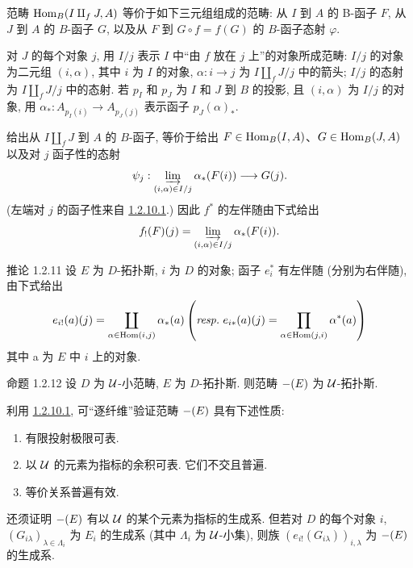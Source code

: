 \sisi{$+$}{} 范畴 $\operatorname{Hom}_B(I \amalg_f J, A)$ 等价于如下三元组组成的范畴:
从 $I$ 到 $A$ 的 B-函子 $F$, 从 $J$ 到 $A$ 的 $B$-函子 $G$,
以及从 $F$ 到 $G \circ f = f(G)$ 的 $B$-函子态射 $\varphi$.

\sisi{$+$}{} 对 $J$ 的每个对象 $j$, 用 $I /j$ 表示 $I$ 中“由 $f$ 放在 $j$ 上”的对象所成范畴:
$I /j$ 的对象为二元组 $(i, \alpha)$, 其中 $i$ 为 $I$ 的对象,
$\alpha : i \to j$ 为 $I \amalg_f J/j$ 中的箭头;
$I/j$ 的态射为 $I\amalg_{f}J/j$ 中的态射.
若 $p_I$ 和 $p_J$ 为 $I$ 和 $J$ 到 $B$ 的投影, 且 $(i, \alpha)$ 为 $I/j$ 的对象,
用 $\alpha_{\ast} : A_{p_{I}(i)} \to A_{p_{J}(j)}$ 表示函子 $p_{J}(\alpha)_{\ast}$.

\sisi{$+$}{} 给出从 $I \amalg_f J$ 到 $A$ 的 $B$-函子,
等价于给出 $F \in \operatorname{Hom}_B (I, A)$、$G \in \operatorname{Hom}_B (J, A)$
以及对 $j$ 函子性的态射
$$
\psi_j : \varinjlim_{(i, \alpha)\in I/j} \alpha_{\ast}(F(i))
\longrightarrow G(j){}.
$$
(左端对 $j$ 的函子性来自 \hyperref[Vbis.lem1.2.10.1]{1.2.10.1}.)
因此 $f^{\ast}$ 的左伴随由下式给出
$$
f_{!}(F) (j) = \varinjlim_{(i, \alpha)\in I/j}
\alpha_{\ast}(F(i)){}.
$$

\begin{enonce*}{推论 1.2.11}
设\pageoriginale{} $E$ 为 $D$-拓扑斯, $i$ 为 $D$ 的对象;
函子 $e^{\ast}_i$ 有左伴随 (分别为右伴随), 由下式给出
$$
e_{i!}(a)(j) = \coprod_{\alpha \in \operatorname{Hom}(i, j)} \alpha_{\ast}(a)
\left( \emph{resp.\kern.3em} e_{i\ast} (a) (j) = \prod_{\alpha \in \operatorname{Hom}(j,
  i)} \alpha^{\ast}(a)\right)
$$
其中 a 为 $E$ 中 $i$ 上的对象.
\end{enonce*}

\begin{enonce*}{命题 1.2.12}
设 $D$ 为 ${\mathcal U}$-小范畴, $E$ 为 $D$-拓扑斯.
则范畴 $\Ysheaf{\Gamma}(E)$ 为 ${\mathcal U}$-拓扑斯.
\end{enonce*}

\sisi{$+$}{} 利用 \hyperref[Vbis.lem1.2.10.1]{1.2.10.1},
可“逐纤维”验证范畴 $\Ysheaf{\Gamma}(E)$ 具有下述性质:
\begin{enumerate}
\renewcommand{\theenumi}{\alph{enumi}}
\renewcommand{\labelenumi}{\theenumi)}
\item 有限投射极限可表.
\item 以 ${\mathcal U}$ 的元素为指标的余积可表. 它们不交且普遍.
\item 等价关系普遍有效.
\end{enumerate}

\sisi{$+$}{} 还须证明 $\Ysheaf{\Gamma}(E)$ 有以 ${\mathcal U}$ 的某个元素为指标的生成系.
但若对 $D$ 的每个对象 $i$, $(G_{i\lambda})_{\lambda \in \Lambda_{i}}$
为 $E_i$ 的生成系 (其中 $\Lambda_i$ 为 ${\mathcal U}$-小集),
则族 $(e_{i!}(G_{i\lambda}))_{i, \lambda}$ 为 $\Ysheaf{\Gamma}(E)$ 的生成系.

